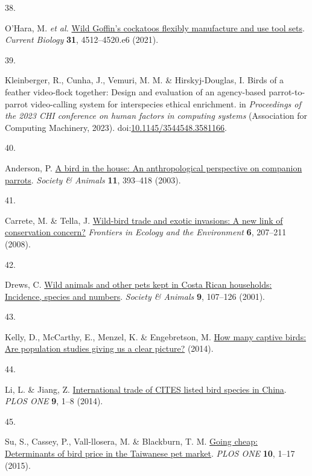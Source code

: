 \documentclass[
  man,floatsintext]{apa6}
\newlength{\cslhangindent}
\newlength{\csllabelwidth}
\newlength{\cslentryspacingunit} %
\newenvironment{CSLReferences}[2] %
 {%
  \setlength{\parindent}{0pt}
  \ifodd #1
  \let\oldpar\par
  \def\par{\hangindent=\cslhangindent\oldpar}
  \fi
  \setlength{\parskip}{#2\cslentryspacingunit}
 }%
 {}
\newcommand{\CSLLeftMargin}[1]{\parbox[t]{\csllabelwidth}{#1}}
\newcommand{\CSLRightInline}[1]{\parbox[t]{\linewidth - \csllabelwidth}{#1}\break}
\begin{document}
\begin{CSLReferences}{0}{0}
\leavevmode{}%
\CSLLeftMargin{38. }%
\CSLRightInline{O'Hara, M. \emph{et al.} \href{https://doi.org/10.1016/j.cub.2021.08.009}{Wild {G}offin's cockatoos flexibly manufacture and use tool sets}. \emph{Current Biology} \textbf{31}, 4512--4520.e6 (2021).}

\leavevmode{}%
\CSLLeftMargin{39. }%
\CSLRightInline{Kleinberger, R., Cunha, J., Vemuri, M. M. \& Hirskyj-Douglas, I. Birds of a feather video-flock together: Design and evaluation of an agency-based parrot-to-parrot video-calling system for interspecies ethical enrichment. in \emph{Proceedings of the 2023 CHI conference on human factors in computing systems} (Association for Computing Machinery, 2023). doi:\href{https://doi.org/10.1145/3544548.3581166}{10.1145/3544548.3581166}.}

\leavevmode{}%
\CSLLeftMargin{40. }%
\CSLRightInline{Anderson, P. \href{https://doi.org/10.1163/156853003322796109}{A bird in the house: An anthropological perspective on companion parrots}. \emph{Society \& Animals} \textbf{11}, 393--418 (2003).}

\leavevmode{}%
\CSLLeftMargin{41. }%
\CSLRightInline{Carrete, M. \& Tella, J. \href{https://doi.org/10.1890/070075}{Wild-bird trade and exotic invasions: A new link of conservation concern?} \emph{Frontiers in Ecology and the Environment} \textbf{6}, 207--211 (2008).}

\leavevmode{}%
\CSLLeftMargin{42. }%
\CSLRightInline{Drews, C. \href{https://doi.org/10.1163/156853001753639233}{Wild animals and other pets kept in {C}osta {R}ican households: Incidence, species and numbers}. \emph{Society \& Animals} \textbf{9}, 107--126 (2001).}

\leavevmode{}%
\CSLLeftMargin{43. }%
\CSLRightInline{Kelly, D., McCarthy, E., Menzel, K. \& Engebretson, M. \href{https://www.avianwelfare.org/issues/overview.htm}{How many captive birds: Are population studies giving us a clear picture?} (2014).}

\leavevmode{}%
\CSLLeftMargin{44. }%
\CSLRightInline{Li, L. \& Jiang, Z. \href{https://doi.org/10.1371/journal.pone.0085012}{International trade of {CITES} listed bird species in {C}hina}. \emph{PLOS ONE} \textbf{9}, 1--8 (2014).}

\leavevmode{}%
\CSLLeftMargin{45. }%
\CSLRightInline{Su, S., Cassey, P., Vall-llosera, M. \& Blackburn, T. M. \href{https://doi.org/10.1371/journal.pone.0127482}{Going cheap: Determinants of bird price in the {T}aiwanese pet market}. \emph{PLOS ONE} \textbf{10}, 1--17 (2015).}


\end{CSLReferences}
\end{document}

